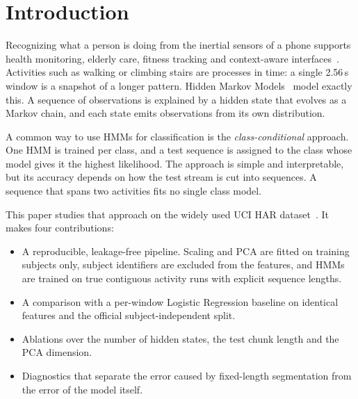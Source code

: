 \documentclass[conference]{IEEEtran}
\begin{document}
\section{Introduction}
Recognizing what a person is doing from the inertial sensors of a phone supports health monitoring, elderly care, fitness tracking and context-aware interfaces~\cite{lara2013survey,bulling2014tutorial}. Activities such as walking or climbing stairs are processes in time: a single 2.56\,s window is a snapshot of a longer pattern. Hidden Markov Models~\cite{rabiner1989tutorial} model exactly this. A sequence of observations is explained by a hidden state that evolves as a Markov chain, and each state emits observations from its own distribution.

A common way to use HMMs for classification is the \emph{class-conditional} approach. One HMM is trained per class, and a test sequence is assigned to the class whose model gives it the highest likelihood. The approach is simple and interpretable, but its accuracy depends on how the test stream is cut into sequences. A sequence that spans two activities fits no single class model.

This paper studies that approach on the widely used UCI HAR dataset~\cite{anguita2013public}. It makes four contributions:
\begin{itemize}
\item A reproducible, leakage-free pipeline. Scaling and PCA are fitted on training subjects only, subject identifiers are excluded from the features, and HMMs are trained on true contiguous activity runs with explicit sequence lengths.
\item A comparison with a per-window Logistic Regression baseline on identical features and the official subject-independent split.
\item Ablations over the number of hidden states, the test chunk length and the PCA dimension.
\item Diagnostics that separate the error caused by fixed-length segmentation from the error of the model itself.
\end{itemize}
\end{document}
